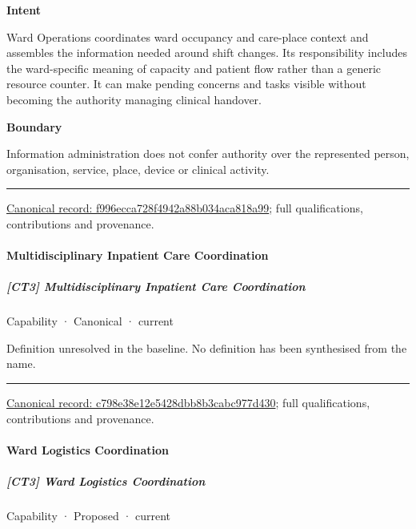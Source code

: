 \textbf{Intent}



Ward Operations coordinates ward occupancy and care-place context and assembles the information needed around shift changes. Its responsibility includes the ward-specific meaning of capacity and patient flow rather than a generic resource counter. It can make pending concerns and tasks visible without becoming the authority managing clinical handover.



\textbf{Boundary}



Information administration does not confer authority over the represented person, organisation, service, place, device or clinical activity.



\medskip\hrule\medskip

{\footnotesize \href{../../../../continuum/strategy/capability/f996ecca728f4942a88b034aca818a99.md}{Canonical record: f996ecca728f4942a88b034aca818a99}; full qualifications, contributions and provenance.}\par
\paragraph{Multidisciplinary Inpatient Care Coordination}

\subparagraph{[CT3] Multidisciplinary Inpatient Care Coordination}

\label{element:c798e38e12e5428dbb8b3cabc977d430}
{\small Capability · Canonical · current}\par

Definition unresolved in the baseline. No definition has been synthesised from the name.



\medskip\hrule\medskip

{\footnotesize \href{../../../../continuum/strategy/capability/c798e38e12e5428dbb8b3cabc977d430.md}{Canonical record: c798e38e12e5428dbb8b3cabc977d430}; full qualifications, contributions and provenance.}\par
\paragraph{Ward Logistics Coordination}

\subparagraph{[CT3] Ward Logistics Coordination}

\label{element:3249647f7b9846c899f982ab339c81f9}
{\small Capability · Proposed · current}\par

